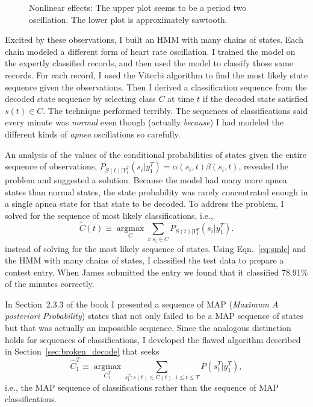 \documentclass[]{article}
\newcommand{\ts}[3]{#1_{#2}^{#3}}                    %
\newcommand{\argmax}{\operatorname*{argmax}}
\newcommand{\ti}[2]{{#1}{(#2)}}                  %
\newcommand{\ie}{i.e.\xspace}
\newcommand{\plotsize}{%
  \fontsize{9}{9}%
  \selectfont}
\renewcommand{\comment}[1]{}
\newcommand{\IncludeApneaFig}[1]{\texttt{[image: ../figs/apnea/\#1.pdf]}}
\begin{document}
\begin{figure}
  \centering{\plotsize%
    \def\aT{\emph{a12} HR}%
    \def\aZ{\emph{a01} HR}%
    \IncludeApneaFig{ApneaNLD}}
  \caption[\comment{fig:ApneaNLD }Nonlinear effects]%
  {Nonlinear effects: The upper plot seems to be a period two
    oscillation.  The lower plot is approximately sawtooth.}\label{fig:ApneaNLD}
\end{figure}

Excited by these observations, I built an HMM with many chains of
states.  Each chain modeled a different form of heart rate
oscillation.  I trained the model on the expertly classified records,
and then used the model to classify those same records.  For each
record, I used the Viterbi algorithm to find the most likely state
sequence given the observations.  Then I derived a classification
sequence from the decoded state sequence by selecting class $C$ at
time $t$ if the decoded state satisfied $\ti{s}{t}\in C$.  The
technique performed terribly.  The sequences of classifications said
every minute was \emph{normal} even though (actually \emph{because}) I had
modeled the different kinds of \emph{apnea} oscillations so carefully.

An analysis of the values of the conditional probabilities of states given
the entire sequence of observations, $P_{\ti{S}{t}|\ts{Y}{1}{T}}
\left(s_i|\ts{y}{1}{T} \right) = \alpha(s_i,t) \beta(s_i,t)$,
revealed the problem and suggested a solution.  Because the model had
many more apnea states than normal states, the state probability was
rarely concentrated enough in a single apnea state for that state to
be decoded.  To address the problem, I solved for the sequence of most
likely classifications, \ie,
\begin{equation}
  \label{eq:smlc}
  \ti{\tilde C}{t} \equiv \argmax_C \sum_{i:s_i\in C}
  P_{\ti{S}{t}|\ts{Y}{1}{T}} \left(s_i|\ts{y}{1}{T} \right).
\end{equation}
instead of solving for the most likely sequence of states.  Using
Eqn.~\eqref{eq:smlc} and the HMM with many chains of states, I
classified the test data to prepare a contest entry.  When James
submitted the entry %
we found that it classified 78.91\% of the minutes correctly.

In Section~2.3.3 of the book I presented a sequence of MAP
(\emph{Maximum A posteriori Probability}) states that not only failed
to be a MAP sequence of states but that was actually an impossible
sequence.  Since the analogous distinction holds for sequences of
classifications, I developed the flawed algorithm described in
Section~\ref{sec:broken_decode} that seeks
\begin{equation}
  \label{eq:mlsc}
  {\ts{\hat C}{1}{T}} \equiv \argmax_{\ts{C}{1}{T} }
  \sum_{\ts{s}{1}{T}:\ti{s}{t}\in \ti{C}{t}, 1 \leq t \leq T} P\left(
    \ts{s}{1}{T} | \ts{y}{1}{T} \right),
\end{equation}
\ie, the MAP sequence of classifications rather than the sequence of
MAP classifications.
\end{document}
